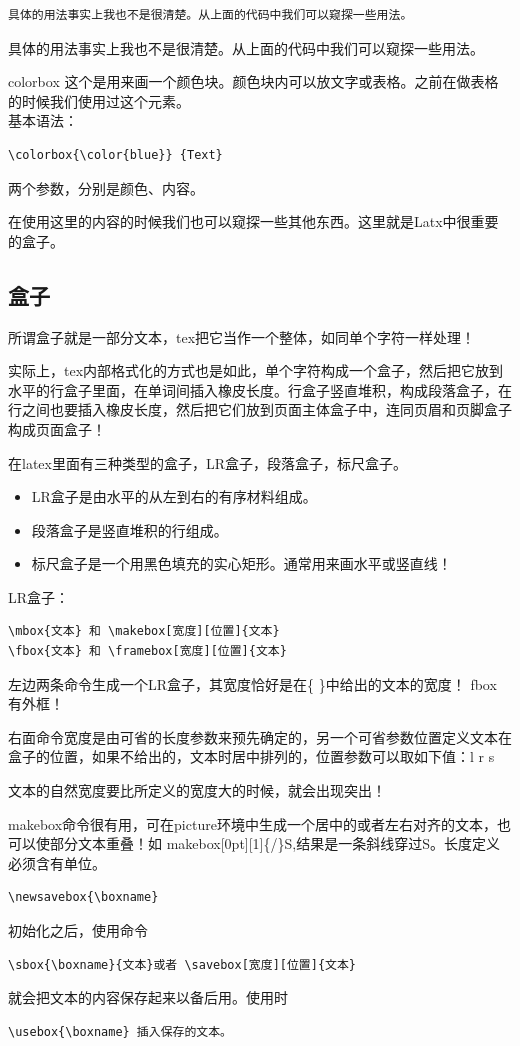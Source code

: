 \documentclass[UTF8]{book}
\begin{document}
{\begin{lstlisting}
具体的用法事实上我也不是很清楚。从上面的代码中我们可以窥探一些用法。
\end{lstlisting}

具体的用法事实上我也不是很清楚。从上面的代码中我们可以窥探一些用法。

colorbox 这个是用来画一个颜色块。颜色块内可以放文字或表格。之前在做表格的时候我们使用过这个元素。\\
基本语法：
\begin{lstlisting}
\colorbox{\color{blue}} {Text}
\end{lstlisting}
两个参数，分别是颜色、内容。

在使用这里的内容的时候我们也可以窥探一些其他东西。这里就是Latx中很重要的盒子。

	\subsection{盒子}
所谓盒子就是一部分文本，tex把它当作一个整体，如同单个字符一样处理！

实际上，tex内部格式化的方式也是如此，单个字符构成一个盒子，然后把它放到水平的行盒子里面，在单词间插入橡皮长度。行盒子竖直堆积，构成段落盒子，在行之间也要插入橡皮长度，然后把它们放到页面主体盒子中，连同页眉和页脚盒子构成页面盒子！

在latex里面有三种类型的盒子，LR盒子，段落盒子，标尺盒子。
\begin{itemize}
\item LR盒子是由水平的从左到右的有序材料组成。
\item 段落盒子是竖直堆积的行组成。
\item 标尺盒子是一个用黑色填充的实心矩形。通常用来画水平或竖直线！
\end{itemize}

LR盒子：
\begin{lstlisting}
\mbox{文本} 和 \makebox[宽度][位置]{文本}
\fbox{文本} 和 \framebox[宽度][位置]{文本}
\end{lstlisting}

左边两条命令生成一个LR盒子，其宽度恰好是在\{ \}中给出的文本的宽度！ fbox 有外框！

右面命令宽度是由可省的长度参数来预先确定的，另一个可省参数位置定义文本在盒子的位置，如果不给出的，文本时居中排列的，位置参数可以取如下值：l  r  s  

文本的自然宽度要比所定义的宽度大的时候，就会出现突出！ 

makebox命令很有用，可在picture环境中生成一个居中的或者左右对齐的文本，也可以使部分文本重叠！如 makebox[0pt][1]\{/\}S,结果是一条斜线穿过S。长度定义必须含有单位。
\begin{lstlisting}
\newsavebox{\boxname}
\end{lstlisting}
初始化之后，使用命令 
\begin{lstlisting}
\sbox{\boxname}{文本}或者 \savebox[宽度][位置]{文本}
\end{lstlisting}
就会把文本的内容保存起来以备后用。使用时
\begin{lstlisting}
\usebox{\boxname} 插入保存的文本。
\end{lstlisting}

}
\end{document}
